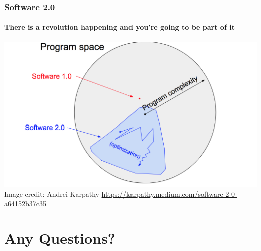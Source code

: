 \documentclass[\beamerclass]{beamer}
\begin{document}
\begin{frame}
\frametitle{Software 2.0}
\framesubtitle{There is a revolution happening and you're going to be part of it}

\centering
\includegraphics[scale=0.24]{software2_0}\\
Image credit: Andrei Karpathy \url{https://karpathy.medium.com/software-2-0-a64152b37c35}
\end{frame}

\section{Any Questions?}
\end{document}
